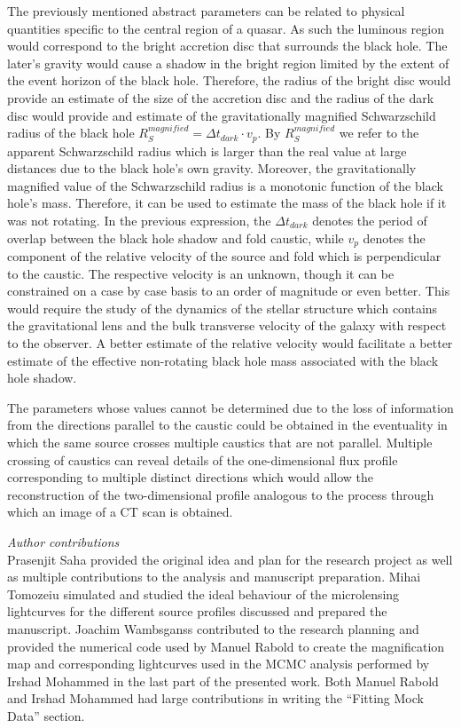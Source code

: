 \documentclass[usenatbib]{mn2e}
\begin{document}
The previously mentioned abstract parameters can be related to
physical quantities specific to the central region of a quasar.  As
such the luminous region would correspond to the bright accretion disc
that surrounds the black hole. The later's gravity would cause a
shadow in the bright region limited by the extent of the event horizon
of the black hole. Therefore, the radius of the bright disc would
provide an estimate of the size of the accretion disc and the radius
of the dark disc would provide and estimate of the gravitationally
magnified Schwarzschild radius of the black hole $R_{S}^{magnified} =
\Delta t_{dark} \cdot v_p$.  By $R_{S}^{magnified}$ we refer to the
apparent Schwarzschild radius which is larger than the real value at
large distances due to the black hole's own gravity.  Moreover, the
gravitationally magnified value of the Schwarzschild radius is a
monotonic function of the black hole's mass. Therefore, it can be used
to estimate the mass of the black hole if it was not rotating. In the
previous expression, the $\Delta t_{dark}$ denotes the period of
overlap between the black hole shadow and fold caustic, while $v_p$
denotes the component of the relative velocity of the source and fold
which is perpendicular to the caustic.  The respective velocity is an
unknown, though it can be constrained on a case by case basis to an
order of magnitude or even better. This would require the study of the
dynamics of the stellar structure which contains the gravitational
lens and the bulk transverse velocity of the galaxy with respect to
the observer.  A better estimate of the relative velocity would
facilitate a better estimate of the effective non-rotating black hole
mass associated with the black hole shadow.

    
The parameters whose values cannot be determined due to the 
loss of information from the directions parallel to the 
caustic could be obtained in the eventuality in which 
the same source crosses multiple caustics that are not parallel. 
Multiple crossing of caustics can reveal details of 
the one-dimensional flux profile corresponding to multiple distinct 
directions which would allow the reconstruction of the 
two-dimensional profile analogous to the process through 
which an image of a CT scan is obtained.  

\textit{Author contributions}\\
Prasenjit Saha provided the original idea and plan for the research project as well as multiple contributions to the analysis 
and manuscript preparation. Mihai Tomozeiu simulated and studied the ideal behaviour of the microlensing lightcurves for the 
different source profiles discussed and prepared the manuscript.
Joachim Wambsganss contributed to the research planning and provided the numerical code used by Manuel Rabold to create 
the magnification map and corresponding lightcurves used in the MCMC analysis performed by Irshad Mohammed in the last 
part of the presented work. Both Manuel Rabold and Irshad Mohammed had large contributions in writing the ``Fitting Mock Data'' section.
\end{document}
